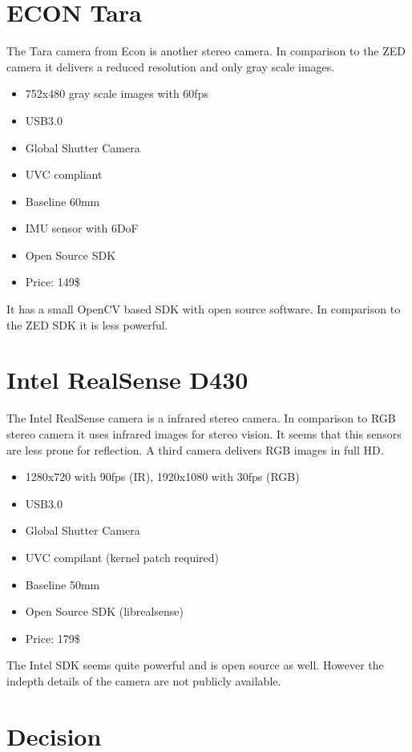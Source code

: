 \documentclass[11pt,a4paper,titlepage,oneside]{report}
\begin{document}
\section{ECON Tara}
The Tara camera from Econ is another stereo camera. In comparison to the ZED camera it delivers a reduced resolution and only gray scale images.
\begin{itemize}
	\item 752x480 gray scale images with 60fps
	\item USB3.0
	\item Global Shutter Camera
	\item UVC compliant
	\item Baseline 60mm
	\item IMU sensor with 6DoF
	\item Open Source SDK
	\item Price: 149\$
\end{itemize}

It has a small OpenCV based SDK with open source software. In comparison to the ZED SDK it is less powerful.

\section{Intel RealSense D430}
The Intel RealSense camera is a infrared stereo camera. In comparison to RGB stereo camera it uses infrared images for stereo vision. It seems that this sensors are less prone for reflection. A third camera delivers RGB images in full HD.
\begin{itemize}
	\item 1280x720 with 90fps (IR), 1920x1080 with 30fps (RGB)
	\item USB3.0
	\item Global Shutter Camera
	\item UVC compilant (kernel patch required)
	\item Baseline 50mm
	\item Open Source SDK (librealsense)
	\item Price: 179\$
\end{itemize}

The Intel SDK seems quite powerful and is open source as well. However the indepth details of the camera are not publicly available.

\section{Decision}
\end{document}
